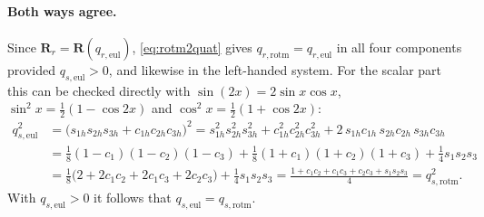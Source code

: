 \documentclass{article}
\theoremstyle{plain}
\theoremstyle{definition}
\newcommand{\vect}[1]{\boldsymbol{#1}}
\begin{document}
\paragraph{Both ways agree.}
Since $\vect R_r = \vect R(q_{r,\mathrm{eul}})$, \eqref{eq:rotm2quat} gives
$q_{r,\mathrm{rotm}} = q_{r,\mathrm{eul}}$ in all four components provided
$q_{s,\mathrm{eul}} > 0$, and likewise in the left-handed system. For the scalar part this can be
checked directly with $\sin(2x) = 2\sin x\cos x$, $\sin^2 x = \frac12(1-\cos 2x)$ and
$\cos^2 x = \frac12(1+\cos 2x)$:
\begin{align}
  q_{s,\mathrm{eul}}^2
  &= \bigl(s_{1h}s_{2h}s_{3h} + c_{1h}c_{2h}c_{3h}\bigr)^2
   = s_{1h}^2s_{2h}^2s_{3h}^2 + c_{1h}^2c_{2h}^2c_{3h}^2
     + 2\, s_{1h}c_{1h}\, s_{2h}c_{2h}\, s_{3h}c_{3h} \nonumber\\
  &= \tfrac18 (1-c_1)(1-c_2)(1-c_3) + \tfrac18 (1+c_1)(1+c_2)(1+c_3) + \tfrac14 s_1s_2s_3 \nonumber\\
  &= \tfrac18 \bigl(2 + 2c_1c_2 + 2c_1c_3 + 2c_2c_3\bigr) + \tfrac14 s_1s_2s_3
   = \frac{1 + c_1c_2 + c_1c_3 + c_2c_3 + s_1s_2s_3}{4}
   = q_{s,\mathrm{rotm}}^2 .
\end{align}
With $q_{s,\mathrm{eul}} > 0$ it follows that $q_{s,\mathrm{eul}} = q_{s,\mathrm{rotm}}$.
\end{document}
